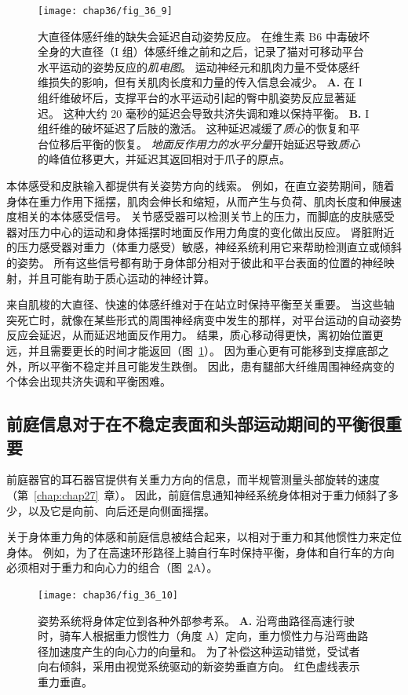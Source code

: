 \begin{figure}[htbp]
	\centering
	\texttt{[image: chap36/fig\_36\_9]}
	\caption{大直径体感纤维的缺失会延迟自动姿势反应。
		在维生素 B6 中毒破坏全身的大直径（I 组）体感纤维之前和之后，记录了猫对可移动平台水平运动的姿势反应的\textit{肌电图}。
		运动神经元和肌肉力量不受体感纤维损失的影响，但有关肌肉长度和力量的传入信息会减少。
		\textbf{A.} 在 I 组纤维破坏后，支撑平台的水平运动引起的臀中肌姿势反应显著延迟。
		这种大约 20 毫秒的延迟会导致共济失调和难以保持平衡。
		\textbf{B.} I 组纤维的破坏延迟了后肢的激活。
		这种延迟减缓了\textit{质心}的恢复和平台位移后平衡的恢复。
		\textit{地面反作用力的水平分量}开始延迟导致\textit{质心}的峰值位移更大，并延迟其返回相对于爪子的原点。}
	\label{fig:36_9}
\end{figure}


本体感受和皮肤输入都提供有关姿势方向的线索。
例如，在直立姿势期间，随着身体在重力作用下摇摆，肌肉会伸长和缩短，从而产生与负荷、肌肉长度和伸展速度相关的本体感受信号。
关节感受器可以检测关节上的压力，而脚底的皮肤感受器对压力中心的运动和身体摇摆时地面反作用力角度的变化做出反应。
肾脏附近的压力感受器对重力（体重力感受）敏感，神经系统利用它来帮助检测直立或倾斜的姿势。
所有这些信号都有助于身体部分相对于彼此和平台表面的位置的神经映射，并且可能有助于质心运动的神经计算。


来自肌梭的大直径、快速的体感纤维对于在站立时保持平衡至关重要。
当这些轴突死亡时，就像在某些形式的周围神经病变中发生的那样，对平台运动的自动姿势反应会延迟，从而延迟地面反作用力。
结果，质心移动得更快，离初始位置更远，并且需要更长的时间才能返回（图~\ref{fig:36_9}）。
因为重心更有可能移到支撑底部之外，所以平衡不稳定并且可能发生跌倒。
因此，患有腿部大纤维周围神经病变的个体会出现共济失调和平衡困难。



\subsection{前庭信息对于在不稳定表面和头部运动期间的平衡很重要}

前庭器官的耳石器官提供有关重力方向的信息，而半规管测量头部旋转的速度（第~\ref{chap:chap27}~章）。
因此，前庭信息通知神经系统身体相对于重力倾斜了多少，以及它是向前、向后还是向侧面摇摆。


关于身体重力角的体感和前庭信息被结合起来，以相对于重力和其他惯性力来定位身体。
例如，为了在高速环形路径上骑自行车时保持平衡，身体和自行车的方向必须相对于重力和向心力的组合（图~\ref{fig:36_10}A）。


\begin{figure}[htbp]
	\centering
	\texttt{[image: chap36/fig\_36\_10]}
	\caption{姿势系统将身体定位到各种外部参考系。
		\textbf{A.} 沿弯曲路径高速行驶时，骑车人根据重力惯性力（角度 A）定向，重力惯性力与沿弯曲路径加速度产生的向心力的向量和。
		为了补偿这种运动错觉，受试者向右倾斜，采用由视觉系统驱动的新姿势垂直方向。
		红色虚线表示重力垂直。 }
	\label{fig:36_10}
\end{figure}


